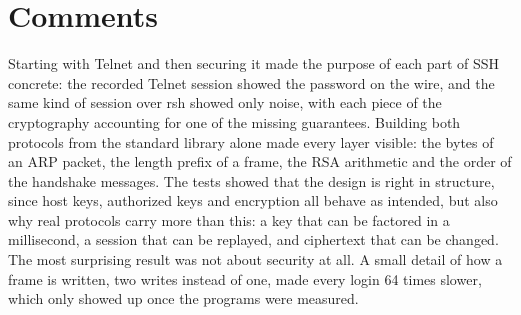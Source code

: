 \documentclass[11pt,a4paper]{article}
\begin{document}
\section{Comments}

Starting with Telnet and then securing it made the purpose of each part of
SSH concrete: the recorded Telnet session showed the password on the wire, and
the same kind of session over rsh showed only noise, with each piece of the
cryptography accounting for one of the missing guarantees. Building both
protocols from the standard library alone made every layer visible: the bytes of an ARP packet, the length prefix of a frame, the RSA
arithmetic and the order of the handshake messages. The tests showed that the
design is right in structure, since host keys, authorized keys and encryption
all behave as intended, but also why real protocols carry more than this: a key
that can be factored in a millisecond, a session that can be replayed, and
ciphertext that can be changed. The most surprising result was not about
security at all. A small detail of how a frame is written, two writes instead
of one, made every login 64 times slower, which only showed up once the
programs were measured.
\end{document}
